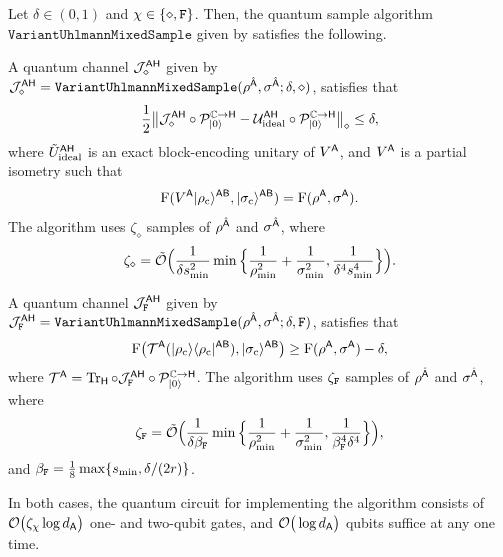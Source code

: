 \begin{theorem}
\label{thm:variant of uhlmann mixed sample}
    
Let $\delta \in (0, 1)$ and $\chi \in \{\diamond, \mathtt{F}\}$. 
Then, the quantum sample algorithm $\mathtt{VariantUhlmannMixedSample}$ given by  satisfies the following.

A quantum channel ${\mathcal{J}}_\diamond^{{\mathsf{A}}{\mathsf{H}}}$ given by ${\mathcal{J}}_\diamond^{{\mathsf{A}}{\mathsf{H}}}  
    =\mathtt{VariantUhlmannMixedSample}(\rho^{\hat{{\mathsf{A}}}}, \sigma^{\hat{{\mathsf{A}}}}; \delta, \diamond)$, satisfies that
\begin{equation}
    \frac{1}{2}\big\|{\mathcal{J}}_\diamond^{{\mathsf{A}}{\mathsf{H}}}\circ{\mathcal{P}}_{|0\rangle}^{\mathbb{C}\rightarrow{\mathsf{H}}} - {\mathcal{U}}_{\rm ideal}^{{\mathsf{A}}{\mathsf{H}}}\circ{\mathcal{P}}_{|0\rangle}^{\mathbb{C}\rightarrow{\mathsf{H}}}\big\|_\diamond \leq \delta,
\end{equation}
where $\tilde{U}_{\rm ideal}^{{\mathsf{A}}{\mathsf{H}}}$ is an exact block-encoding unitary of $V^{\mathsf{A}}$, and $V^{\mathsf{A}}$ is a partial isometry such that
\begin{align}
    {\mathrm{F}}(V^{\mathsf{A}}|\rho_{\rm c}\rangle^{{\mathsf{A}}{\mathsf{B}}}, |\sigma_{\rm c}\rangle^{{\mathsf{A}}{\mathsf{B}}}) = {\mathrm{F}}(\rho^{\mathsf{A}}, \sigma^{\mathsf{A}}).
\end{align}
The algorithm uses $\zeta_\diamond$ samples of $\rho^{\hat{{\mathsf{A}}}}$ and $\sigma^{\hat{{\mathsf{A}}}}$, where 
\begin{align}
\label{inteq:146}
    \zeta_\diamond = \tilde{{\mathcal{O}}}\Big(\frac{1}{\delta s_{\rm min}^2} \min\Big\{\frac{1}{\rho_{\rm min}^2} + \frac{1}{\sigma_{\rm min}^2}, \frac{1}{\delta^4 s_{\rm min}^4}\Big\}\Big).
\end{align}

A quantum channel ${\mathcal{J}}_{\mathtt{F}}^{{\mathsf{A}}{\mathsf{H}}}$ given by ${\mathcal{J}}_{\mathtt{F}}^{{\mathsf{A}}{\mathsf{H}}} 
    = \mathtt{VariantUhlmannMixedSample}(\rho^{\hat{{\mathsf{A}}}}, \sigma^{\hat{{\mathsf{A}}}}; \delta, \mathtt{F})$, satisfies that
\begin{align}
    {\mathrm{F}}\big({\mathcal{T}}^{{\mathsf{A}}}(|\rho_{\rm c}\rangle\langle\rho_{\rm c}|^{{\mathsf{A}}{\mathsf{B}}}), |\sigma_{\rm c}\rangle^{{\mathsf{A}}{\mathsf{B}}}\big) \geq {\mathrm{F}}(\rho^{\mathsf{A}}, \sigma^{\mathsf{A}}) - \delta,
\end{align}
where ${\mathcal{T}}^{{\mathsf{A}}}= \operatorname{Tr}_{\mathsf{H}}\circ{\mathcal{J}}_{\mathtt{F}}^{{\mathsf{A}}{\mathsf{H}}}\circ{\mathcal{P}}_{|0\rangle}^{\mathbb{C}\rightarrow{\mathsf{H}}}$.
The algorithm uses $\zeta_{\mathtt{F}}$ samples of $\rho^{\hat{{\mathsf{A}}}}$ and $\sigma^{\hat{{\mathsf{A}}}}$, where 
\begin{align}
\label{inteq:145}
    \zeta_{\mathtt{F}} = \tilde{{\mathcal{O}}}\Big(\frac{1}{\delta\beta_{\mathtt{F}}}\min\Big\{\frac{1}{\rho_{\rm min}^2} + \frac{1}{\sigma_{\rm min}^2}, \frac{1}{\beta_{\mathtt{F}}^4\delta^4}\Big\}\Big),
\end{align}
and $\beta_{\mathtt{F}} = \frac{1}{8}\max\{s_{\rm min}, \delta/(2r)\}$.

In both cases, the quantum circuit for implementing the algorithm consists of ${\mathcal{O}}\big(\zeta_\chi \log{d_{\mathsf{A}}}\big)$ one- and two-qubit gates, and ${\mathcal{O}}\big(\log{d_{\mathsf{A}}}\big)$ qubits suffice at any one time.


\end{theorem}




